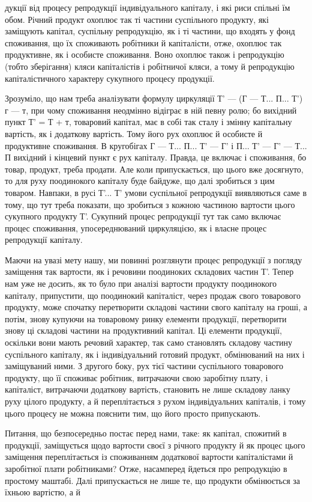 дукції від процесу репродукції індивідуального капіталу, і які риси
спільні їм обом. Річний продукт охоплює так ті частини суспільного
продукту, які заміщують капітал, суспільну репродукцію, як і ті частини,
що входять у фонд споживання, що їх споживають робітники й капіталісти,
отже, охоплює так продуктивне, як і особисте споживання. Воно
охоплює також і репродукцію (тобто зберігання) кляси капіталістів і
робітничої кляси, а тому й репродукцію капіталістичного характеру сукупного
процесу продукції.

Зрозуміло, що нам треба аналізувати формулу циркуляції
Т' — (Г — Т... П... Т') г — т, при чому споживання неодмінно відіграє в ній
певну ролю; бо вихідний пункт Т' = Т + т, товаровий капітал, має в
собі так сталу і змінну капітальну вартість, як і додаткову вартість.
Тому його рух охоплює й особисте й продуктивне споживання. В кругобігах
Г — Т... П... Т' — Г' і П... Т' — Г' — Т... П вихідний і кінцевий
пункт є рух капіталу. Правда, це включає і споживання, бо товар,
продукт, треба продати. Але коли припускається, що цього вже досягнуто,
то для руху поодинокого капіталу буде байдуже, що далі зробиться
з цим товаром. Навпаки, в русі Т'... Т' умови суспільної репродукції
виявляються саме в тому, що тут треба показати, що зробиться з кожною
частиною вартости цього сукупного продукту Т'. Сукупний процес
репродукції тут так само включає процес споживання, упосереднюваний
циркуляцією, як і власне процес репродукції капіталу.

Маючи на увазі мету нашу, ми повинні розглянути процес репродукції
з погляду заміщення так вартости, як і речовини поодиноких складових
частин Т'. Тепер нам уже не досить, як то було при аналізі вартости
продукту поодинокого капіталу, припустити, що поодинокий
капіталіст, через продаж свого товарового продукту, може спочатку перетворити
складові частини свого капіталу на гроші, а потім, знову купуючи
на товаровому ринку елементи продукції, перетворити знову ці
складові частини на продуктивний капітал. Ці елементи продукції, оскільки
вони мають речовий характер, так само становлять складову частину
суспільного капіталу, як і індивідуальний готовий продукт, обмінюваний
на них і заміщуваний ними. З другого боку, рух тієї частини суспільного
товарового продукту, що її споживає робітник, витрачаючи свою
заробітну плату, і капіталіст, витрачаючи додаткову вартість, становить не
лише складову ланку руху цілого продукту, а й переплітається з рухом
індивідуальних капіталів, і тому цього процесу не можна пояснити тим,
що його просто припускають.

Питання, що безпосередньо постає перед нами, таке: як капітал,
спожитий в продукції, заміщується щодо вартости своєї з річного продукту
й як процес цього заміщення переплітається із споживанням додаткової
вартости капіталістами й заробітної плати робітниками? Отже,
насамперед йдеться про репродукцію в простому маштабі. Далі припускається
не лише те, що продукти обмінюється за їхньою вартістю, а й
